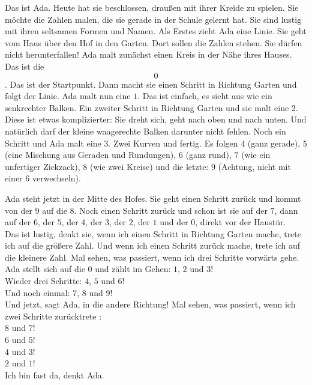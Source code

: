 Das ist Ada. Heute hat sie beschlossen, draußen mit ihrer Kreide zu spielen. 
Sie möchte die Zahlen malen, die sie gerade in der Schule gelernt hat. Sie sind lustig mit ihren seltsamen Formen und Namen.
Als Erstes zieht Ada eine Linie. Sie geht vom Haus über den Hof in den Garten.
Dort sollen die Zahlen stehen. Sie dürfen nicht herunterfallen! 
Ada malt zunächst einen Kreis in der Nähe ihres Hauses. Das ist die $$0$$. Das ist der Startpunkt. 
Dann macht sie einen Schritt in Richtung Garten und folgt der Linie. Ada malt nun eine $1$. Das ist einfach, es sieht aus wie ein senkrechter Balken. 
Ein zweiter Schritt in Richtung Garten und sie malt eine $2$. Diese ist etwas komplizierter: Sie dreht sich, geht nach oben und nach unten. Und natürlich darf der kleine waagerechte Balken darunter nicht fehlen.
Noch ein Schritt und Ada malt eine $3$. Zwei Kurven und fertig.
Es folgen $4$ (ganz gerade), $5$ (eine Mischung aus Geraden und Rundungen), $6$ (ganz rund), $7$ (wie ein unfertiger Zickzack), $8$ (wie zwei Kreise) und die letzte: $9$ (Achtung, nicht mit einer $6$ verwechseln). 

Ada steht jetzt in der Mitte des Hofes. Sie geht einen Schritt zurück und kommt von der $9$ auf die $8$. Noch einen Schritt zurück und schon ist sie auf der $7$, dann auf der $6$, der $5$, der $4$, der $3$, der $2$, der $1$ und der $0$, direkt vor der Haustür.\\ 
\frqq{}Das ist lustig\flqq{}, denkt sie, \frqq{}wenn ich einen Schritt in Richtung Garten mache, trete ich auf die größere Zahl. Und wenn ich einen Schritt zurück mache, trete ich auf die kleinere Zahl. 
Mal sehen, was passiert, wenn ich drei Schritte vorwärts gehe.\flqq{}\\
Ada stellt sich auf die $0$ und zählt im Gehen: \frqq{}$1$, $2$ und $3$!\flqq{}\\
Wieder drei Schritte: \frqq{}$4$, $5$ und $6$!\flqq{}\\
Und noch einmal: \frqq{}$7$, $8$ und $9$!\flqq{}\\
\frqq{}Und jetzt\flqq{}, sagt Ada, \frqq{}in die andere Richtung!\flqq{} Mal sehen, was passiert, wenn ich zwei Schritte zurücktrete : \\
\frqq{}$8$ und $7$!\flqq{}\\ 
\frqq{}$6$ und $5$!\flqq{}\\ 
\frqq{}$4$ und $3$!\flqq{}\\ 
\frqq{}$2$ und $1$!\flqq{}\\
\frqq{}Ich bin fast da\flqq{}, denkt Ada.
